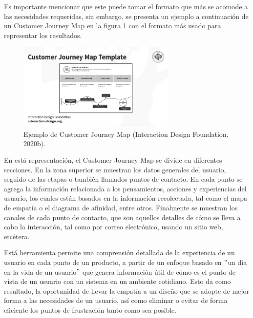 Es importante mencionar que este puede tomar el formato que más se acomode a las necesidades requeridas, sin embargo, se presenta un ejemplo a continuación de un Customer Journey Map en la figura \ref{fig:35} con el formato más usado para representar los resultados.

\begin{figure}[H]
  \centering
  \includegraphics[width=0.70\textwidth]{Cap3/Figuras/CustomerJourneyMapEjemplo.png}
  \caption{Ejemplo de Customer Journey Map (Interaction Design Foundation, 2020b).}
  \label{fig:35}
\end{figure}

En está representación, el Customer Journey Map se divide en diferentes secciones. En la zona superior se muestran los datos generales del usuario, seguido de las etapas o también llamados puntos de contacto. En cada punto se agrega la información relacionada a los pensamientos, acciones y experiencias del usuario, los cuales están basados en la información recolectada, tal como el mapa de empatía o el diagrama de afinidad, entre otros. Finalmente se muestran los canales de cada punto de contacto, que son aquellos detalles de cómo se lleva a cabo la interacción, tal como por correo electrónico, usando un sitio web, etcétera.

Está herramienta permite una comprensión detallada de la experiencia de un usuario en cada punto de un producto, a partir de un enfoque basado en $"$un día en la vida de un usuario$"$ que genera información útil de cómo es el punto de vista de un usuario con un sistema en un ambiente cotidiano. Esto da como resultado, la oportunidad de llevar la empatía a un diseño que se adopte de mejor forma a las necesidades de un usuario, así como eliminar o evitar de forma eficiente los puntos de frustración tanto como sea posible.


